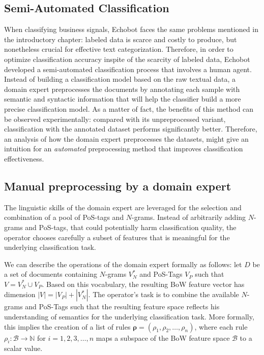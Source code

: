 \subsection{Semi-Automated Classification}
 
When classifying business signals, Echobot faces the same problems 
mentioned in the introductory chapter: labeled data is scarce and costly to produce, 
but nonetheless crucial for effective text categorization. Therefore, in order
to optimize classification accuracy inspite of the scarcity of labeled data, Echobot developed 
a semi-automated classification process that involves a human agent. Instead of
building a classification model based on the raw textual data, a domain expert
preprocesses the documents by annotating each sample with semantic and
syntactic information that will help the classifier build a more precise
classification model. As a matter of fact, the benefits of this method can be
observed experimentally: compared with its unpreprocessed variant, classification with
the annotated dataset performs significantly better. Therefore, an analysis of
how the domain expert preprocesses the datasets, might give an intuition for
an \emph{automated} preprocessing method that improves classification
effectiveness.

\subsection{Manual preprocessing by a domain expert}

The linguistic skills of the domain expert are leveraged for the selection 
and combination of a pool of PoS-tags and $N$-grams. Instead of arbitrarily
adding $N$-grams and PoS-tags, that could potentially harm classification quality, 
the operator chooses carefully a subset of features that is meaningful for the
underlying classification task.

We can describe the operations of the domain expert formally as follows:
let $D$ be a set of documents containing $N$-grams $V_N^*$ and
PoS-Tags $V_P$ such that $V = V_N^* \cup V_P$. Based on this vocabulary,
the resulting BoW feature vector has dimension $|V| = |V_P| + |V_N^*|$.
The operator's task is to combine the available $N$-grams and PoS-Tags
such that the resulting feature space reflects his understanding
of semantics for the underlying classification task.
More formally, this implies the creation of a list of rules
$\boldsymbol{\rho} = (\rho_1, \rho_2, \ldots, \rho_n)$, where each rule $\rho_i:
\mathcal{B} \to \mathbb{N}$ for $i=1,2,3,\ldots,n$ maps a subspace of the BoW
feature space $\mathcal{B}$ to a scalar value.

